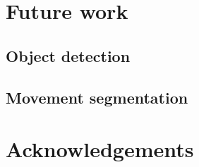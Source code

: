 \documentclass{l4proj}
\begin{document}
\section{Future work}

\subsection{Object detection}

\subsection{Movement segmentation}

\section{Acknowledgements}

%
% 
\end{document}
